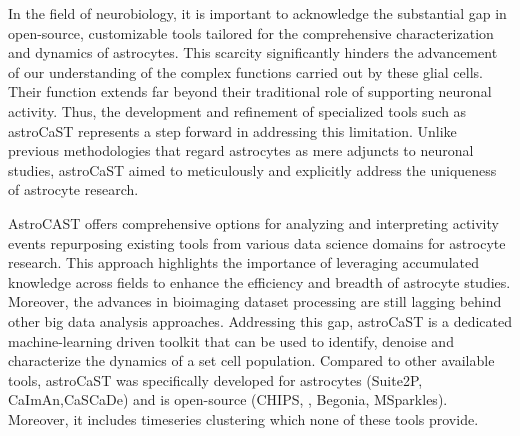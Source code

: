 In the field of neurobiology, it is important to acknowledge the substantial gap in open-source, customizable tools tailored for the comprehensive characterization and dynamics of astrocytes. This scarcity significantly hinders the advancement of our understanding of the complex functions carried out by these glial cells. Their function extends far beyond their traditional role of supporting neuronal activity\citep{montalant_role_2021,ransom_new_2003}. Thus, the development and refinement of specialized tools such as astroCaST represents a step forward in addressing this limitation. Unlike previous methodologies that regard astrocytes as mere adjuncts to neuronal studies, astroCaST aimed to meticulously and explicitly address the uniqueness of astrocyte research.

AstroCAST offers comprehensive options for analyzing and interpreting activity events repurposing existing tools from various data science domains for astrocyte research. This approach highlights the importance of leveraging accumulated knowledge across fields to enhance the efficiency and breadth of astrocyte studies. Moreover, the advances in bioimaging dataset processing are still lagging behind other big data analysis approaches. Addressing this gap, astroCaST is a dedicated machine-learning driven toolkit that can be used to identify, denoise and characterize the dynamics of a set cell population. Compared to other available tools, astroCaST was specifically developed for astrocytes (Suite2P\citep{pachitariu_suite2p_2017}, CaImAn\citep{giovannucci_caiman_2019},CaSCaDe\citep{rupprecht_database_2021}) and is open-source (CHIPS\citep{barrett_chips_2018}, \citep{wang_event-based_2018}, Begonia\citep{bjornstad_begoniatwo-photon_2021}, MSparkles\citep{stopper_novel_2022}). Moreover, it includes timeseries clustering which none of these tools provide. 

